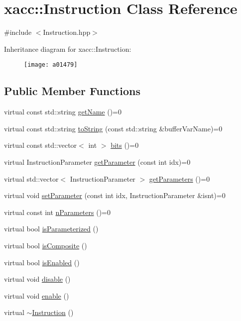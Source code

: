 \hypertarget{a01479}{}\section{xacc\+:\+:Instruction Class Reference}
\label{a01479}


{\ttfamily \#include $<$Instruction.\+hpp$>$}

Inheritance diagram for xacc\+:\+:Instruction\+:\begin{figure}[H]
\begin{center}
\leavevmode
\texttt{[image: a01479]}
\end{center}
\end{figure}
\subsection*{Public Member Functions}
\begin{DoxyCompactItemize}
\item 
virtual const std\+::string \hyperlink{a01479_ac7ff23f693e2276edbf3fdac5452792c}{get\+Name} ()=0
\item 
virtual const std\+::string \hyperlink{a01479_ae94c2d089908294c1d410b14c96817ae}{to\+String} (const std\+::string \&buffer\+Var\+Name)=0
\item 
virtual const std\+::vector$<$ int $>$ \hyperlink{a01479_a819f32e94c3e1c9e69a0061aaf8d86dc}{bits} ()=0
\item 
virtual Instruction\+Parameter \hyperlink{a01479_aa0d9de97a4833a042379647f83c33ab6}{get\+Parameter} (const int idx)=0
\item 
virtual std\+::vector$<$ Instruction\+Parameter $>$ \hyperlink{a01479_aeb67c67713896e8f27a5c7dd531f3340}{get\+Parameters} ()=0
\item 
virtual void \hyperlink{a01479_a407a0ac662fa0b1ec3e301e8ff9bade7}{set\+Parameter} (const int idx, Instruction\+Parameter \&isnt)=0
\item 
virtual const int \hyperlink{a01479_ad54585d13c04ffd20296fff7ab8107ff}{n\+Parameters} ()=0
\item 
virtual bool \hyperlink{a01479_a7b24d8ae485369fc2b2df7a3224a5e26}{is\+Parameterized} ()
\item 
virtual bool \hyperlink{a01479_a4383f1036d0fcfe890ab9c613dbd5f38}{is\+Composite} ()
\item 
virtual bool \hyperlink{a01479_ad02a1cf7220577124720b7a51424cea7}{is\+Enabled} ()
\item 
virtual void \hyperlink{a01479_a6e528da15e05a94cc1d7db268c483271}{disable} ()
\item 
virtual void \hyperlink{a01479_a0b4f2e5a591af28342a3c08e4305e24f}{enable} ()
\item 
virtual \hyperlink{a01479_ae22c935e8113bce63d1d0e214cda4d61}{$\sim$\+Instruction} ()
\end{DoxyCompactItemize}
